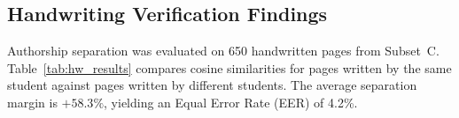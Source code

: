 \documentclass[conference]{IEEEtran}
\begin{document}
\begin{table}[htbp]
\caption{Plagiarism Localization Accuracy Across Alteration Modes}
\label{tab:plag_results}
\begin{center}
\end{center}
\end{table}

\subsection{Handwriting Verification Findings}
Authorship separation was evaluated on 650 handwritten pages from Subset~C. Table~\ref{tab:hw_results} compares cosine similarities for pages written by the same student against pages written by different students. The average separation margin is $+58.3\%$, yielding an Equal Error Rate (EER) of 4.2\%.

\begin{table}[htbp]
\caption{Handwriting Authorship Verification on Subset C}
\label{tab:hw_results}
\begin{center}
\end{center}
\end{table}
\end{document}
